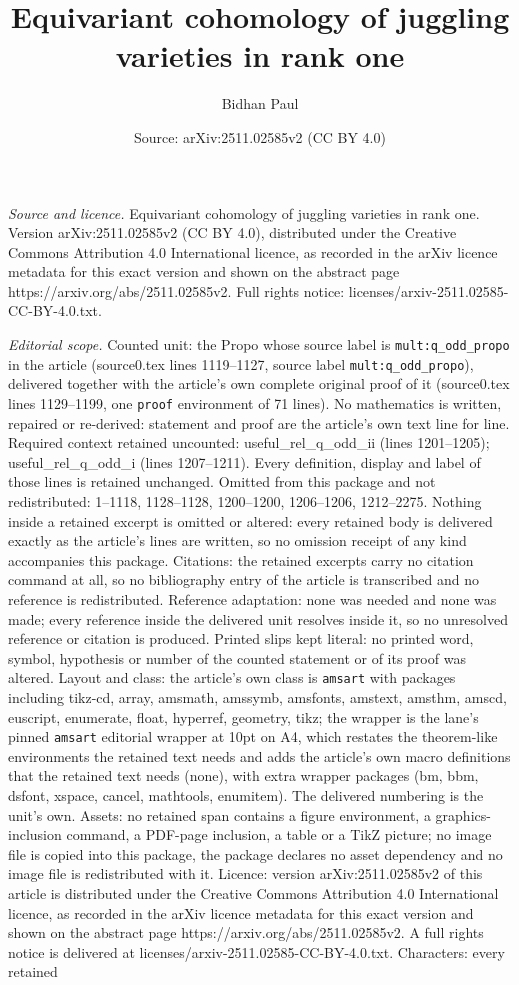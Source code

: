 \documentclass[10pt,a4paper]{amsart}
\title[Equivariant cohomology of juggling varieties in rank one]{Equivariant cohomology of juggling varieties in rank one}
\author{Bidhan Paul}
\date{Source: arXiv:2511.02585v2 (CC BY 4.0)}
\begin{document}
\maketitle

\noindent\emph{Source and licence.} Equivariant cohomology of juggling varieties in rank one. Version arXiv:2511.02585v2 (CC BY 4.0), distributed under the Creative Commons Attribution 4.0 International licence, as recorded in the arXiv licence metadata for this exact version and shown on the abstract page https://arxiv.org/abs/2511.02585v2. Full rights notice: licenses/arxiv-2511.02585-CC-BY-4.0.txt.\par\smallskip

\noindent\textit{Editorial scope.} Counted unit: the Propo whose source label is \texttt{mult:q\_odd\_propo} in the article (source0.tex lines 1119--1127, source label \texttt{mult:q\_odd\_propo}), delivered together with the article's own complete original proof of it (source0.tex lines 1129--1199, one \texttt{proof} environment of 71 lines). No mathematics is written, repaired or re-derived: statement and proof are the article's own text line for line. Required context retained uncounted: useful\_rel\_q\_odd\_ii (lines 1201--1205); useful\_rel\_q\_odd\_i (lines 1207--1211). Every definition, display and label of those lines is retained unchanged. Omitted from this package and not redistributed: 1--1118, 1128--1128, 1200--1200, 1206--1206, 1212--2275. Nothing inside a retained excerpt is omitted or altered: every retained body is delivered exactly as the article's lines are written, so no omission receipt of any kind accompanies this package. Citations: the retained excerpts carry no citation command at all, so no bibliography entry of the article is transcribed and no reference is redistributed. Reference adaptation: none was needed and none was made; every reference inside the delivered unit resolves inside it, so no unresolved reference or citation is produced. Printed slips kept literal: no printed word, symbol, hypothesis or number of the counted statement or of its proof was altered. Layout and class: the article's own class is \texttt{amsart} with packages including tikz-cd, array, amsmath, amssymb, amsfonts, amstext, amsthm, amscd, euscript, enumerate, float, hyperref, geometry, tikz; the wrapper is the lane's pinned \texttt{amsart} editorial wrapper at 10pt on A4, which restates the theorem-like environments the retained text needs and adds the article's own macro definitions that the retained text needs (none), with extra wrapper packages (bm, bbm, dsfont, xspace, cancel, mathtools, enumitem). The delivered numbering is the unit's own. Assets: no retained span contains a figure environment, a graphics-inclusion command, a PDF-page inclusion, a table or a TikZ picture; no image file is copied into this package, the package declares no asset dependency and no image file is redistributed with it. Licence: version arXiv:2511.02585v2 of this article is distributed under the Creative Commons Attribution 4.0 International licence, as recorded in the arXiv licence metadata for this exact version and shown on the abstract page https://arxiv.org/abs/2511.02585v2. A full rights notice is delivered at licenses/arxiv-2511.02585-CC-BY-4.0.txt. Characters: every retained 
\end{document}
